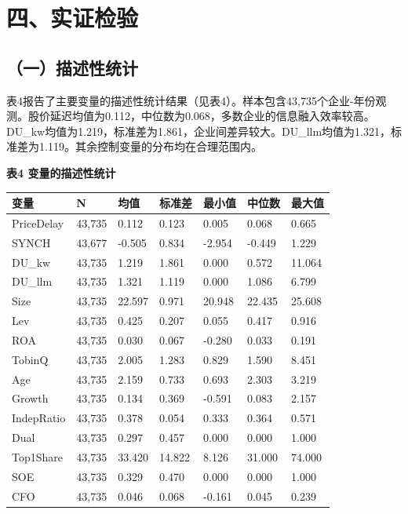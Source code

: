 \section{四、实证检验}\label{ux56dbux5b9eux8bc1ux68c0ux9a8c}

\subsection{（一）描述性统计}\label{ux4e00ux63cfux8ff0ux6027ux7edfux8ba1}

表4报告了主要变量的描述性统计结果（见表4）。样本包含43,735个企业-年份观测。股价延迟均值为0.112，中位数为0.068，多数企业的信息融入效率较高。DU\_kw均值为1.219，标准差为1.861，企业间差异较大。DU\_llm均值为1.321，标准差为1.119。其余控制变量的分布均在合理范围内。

\textbf{表4 变量的描述性统计}

{\def\LTcaptype{} %
\begin{longtable}[]{@{}lllllll@{}}
\toprule\noalign{}
变量 & N & 均值 & 标准差 & 最小值 & 中位数 & 最大值 \\
\midrule\noalign{}
\endhead
\bottomrule\noalign{}
\endlastfoot
PriceDelay & 43,735 & 0.112 & 0.123 & 0.005 & 0.068 & 0.665 \\
SYNCH & 43,677 & -0.505 & 0.834 & -2.954 & -0.449 & 1.229 \\
DU\_kw & 43,735 & 1.219 & 1.861 & 0.000 & 0.572 & 11.064 \\
DU\_llm & 43,735 & 1.321 & 1.119 & 0.000 & 1.086 & 6.799 \\
Size & 43,735 & 22.597 & 0.971 & 20.948 & 22.435 & 25.608 \\
Lev & 43,735 & 0.425 & 0.207 & 0.055 & 0.417 & 0.916 \\
ROA & 43,735 & 0.030 & 0.067 & -0.280 & 0.033 & 0.191 \\
TobinQ & 43,735 & 2.005 & 1.283 & 0.829 & 1.590 & 8.451 \\
Age & 43,735 & 2.159 & 0.733 & 0.693 & 2.303 & 3.219 \\
Growth & 43,735 & 0.134 & 0.369 & -0.591 & 0.083 & 2.157 \\
IndepRatio & 43,735 & 0.378 & 0.054 & 0.333 & 0.364 & 0.571 \\
Dual & 43,735 & 0.297 & 0.457 & 0.000 & 0.000 & 1.000 \\
Top1Share & 43,735 & 33.420 & 14.822 & 8.126 & 31.000 & 74.000 \\
SOE & 43,735 & 0.329 & 0.470 & 0.000 & 0.000 & 1.000 \\
CFO & 43,735 & 0.046 & 0.068 & -0.161 & 0.045 & 0.239 \\
\end{longtable}
}

